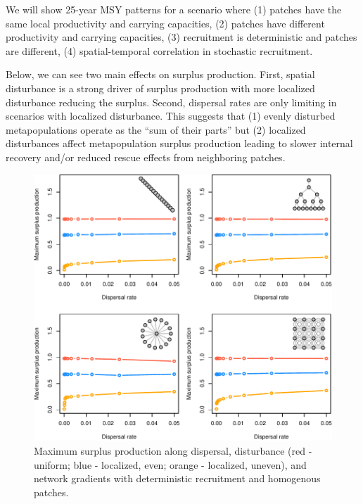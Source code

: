 \documentclass[
]{article}
\begin{document}
We will show 25-year MSY patterns for a scenario where (1) patches have
the same local productivity and carrying capacities, (2) patches have
different productivity and carrying capacities, (3) recruitment is
deterministic and patches are different, (4) spatial-temporal
correlation in stochastic recruitment.

Below, we can see two main effects on surplus production. First, spatial
disturbance is a strong driver of surplus production with more localized
disturbance reducing the surplus. Second, dispersal rates are only
limiting in scenarios with localized disturbance. This suggests that (1)
evenly disturbed metapopulations operate as the ``sum of their parts''
but (2) localized disturbances affect metapopulation surplus production
leading to slower internal recovery and/or reduced rescue effects from
neighboring patches.

\begin{figure}[H]

{\centering \includegraphics{Managing_for_ecological_surprises_in_metapopulations_files/figure-latex/MSY-1} 

}

\caption{Maximum surplus production along dispersal, disturbance (red - uniform; blue - localized, even; orange - localized, uneven), and network gradients with deterministic recruitment and homogenous patches.}\label{fig:MSY}
\end{figure}
\end{document}
